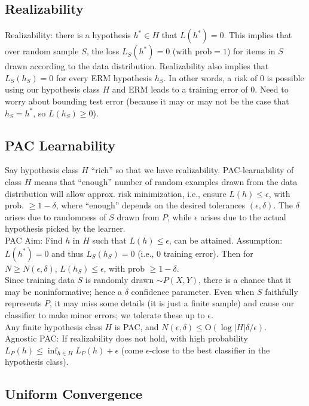 \subsection*{Realizability}

Realizability: there is a hypothesis $h^* \in H$ that $L(h^*) = 0$. This implies that over random sample $S$, the loss $L_S(h^*)=0$
(with prob$=1$) for items in $S$ drawn according to the data distribution. Realizability also implies that $L_S(h_S)=0$ for every ERM hypothesis $h_S$. In other words, a risk of $0$ is possible using our hypothesis class $H$ and ERM leads to a training error of $0$. Need to worry about bounding test error (because it may or may not be the case that $h_S=h^*$, so $L(h_S) \geq 0$).

\subsection*{PAC Learnability}
Say hypothesis class $H$ “rich” so that we have realizability. PAC-learnability of class $H$ means that “enough” number of random examples drawn from the data distribution will allow approx. risk minimization, i.e., ensure $L(h) \leq \epsilon$, with prob. $\geq 1-\delta$, where “enough” depends on the desired tolerances $(\epsilon, \delta)$. The $\delta$ arises due to randomness of $S$ drawn from $P$, while $\epsilon$ arises due to the actual hypothesis picked by the learner.\\
PAC Aim: Find $h$ in $H$ such that $L(h) \leq \epsilon$, can be attained. Assumption: $L(h^*)=0$ and thus $L_S(h_S)=0$ (i.e., 0 training error). Then for $N \geq N(\epsilon, \delta)$, $L(h_S) \leq \epsilon$, with prob $\geq 1-\delta$.\\
Since training data $S$ is randomly drawn $\sim P(X,Y)$, there is a chance that it may be noninformative; hence a $\delta$ confidence parameter. Even when $S$ faithfully represents $P$, it may miss some details (it is just a finite sample) and cause our classifier to make minor errors; we tolerate these up to $\epsilon$.\\
Any finite hypothesis class $H$ is PAC, and $N(\epsilon, \delta) \leq \text{O}(\log|H|\delta/\epsilon)$.\\
Agnostic PAC: If realizability does not hold, with high probability $L_{P}(h) \leq \inf_{h \in H} L_{P}(h) + \epsilon$ (come $\epsilon$-close to the best classifier in the hypothesis class).

\subsection*{Uniform Convergence}

